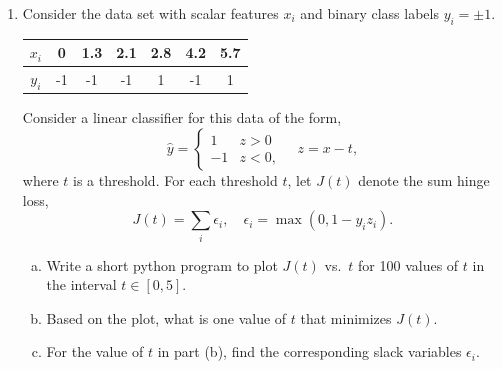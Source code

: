 \documentclass[11pt]{article}
\newcommand{\wbf}{\mathbf{w}}
\begin{document}
\begin{enumerate}
\begin{enumerate}[(a)]
Verification: $(0,0)$: $-0.5 < 0 \to y=-1$; $(1,0.3)$: $-0.2 < 0 \to y=-1$;
$(1,0.7)$: $0.2 > 0 \to y=1$; $(2,1)$: $0.5 > 0 \to y=1$.

\item For each point:
$y_1(b+w_1x_{11}+w_2x_{12}) = -1(-0.5) = 0.5$;
$y_2(b+w_1x_{21}+w_2x_{22}) = -1(-0.2) = 0.2$;
$y_3(b+w_1x_{31}+w_2x_{32}) = 1(0.2) = 0.2$;
$y_4(b+w_1x_{41}+w_2x_{42}) = 1(0.5) = 0.5$.

The maximum $\gamma$ is $\gamma = 0.2$ (the minimum over all points).

\item $m = \frac{\gamma}{\|\wbf\|} = \frac{0.2}{\sqrt{0^2 + 1^2}} = 0.2$.

\item Samples $i=2$ and $i=3$ are on the margin (they achieve $y_i(b+w_1x_{i1}+w_2x_{i2}) = \gamma = 0.2$).
\end{enumerate}

\item  Consider the data set with scalar features $x_i$
and binary class labels $y_i=\pm 1$.

\begin{center}
\begin{tabular}{|c|c|c|c|c|c|c|} \hline
$x_i$ & 0 & 1.3 & 2.1 & 2.8 & 4.2 & 5.7 \\ \hline
$y_i$ & -1 & -1 & -1 & 1 & -1 & 1 \\ \hline
\end{tabular}
\end{center}

Consider a linear classifier for this data of the form,
\[
    \hat{y} = \begin{cases}
        1  & z > 0 \\
        -1 & z < 0,
        \end{cases}
    \quad
    z = x-t,
\]
where $t$ is a threshold.  For each threshold $t$, let $J(t)$
denote the sum hinge loss,
\[
    J(t) = \sum_i \epsilon_i, \quad \epsilon_i = \max(0, 1-y_iz_i).
\]

\begin{enumerate}[(a)]
\item Write a short python program to plot $J(t)$ vs.\ $t$ for
100 values of $t$ in the interval $t \in [0,5]$.

\item Based on the plot, what is one value of $t$ that minimizes
$J(t)$.

\item For the value of $t$ in part (b), find the corresponding
slack variables $\epsilon_i$.


\end{enumerate}
\end{enumerate}
\end{document}
